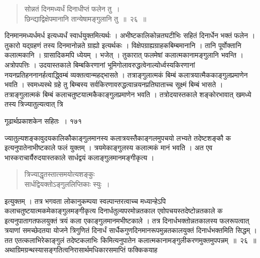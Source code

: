 \documentclass[11pt, openany]{book}
\begin{document}
\begin{quote}
  {\ssi सोन्नतं दिनमध्यर्धं दिनाधीप्तं फलेन तु~।\\
छिन्द्याद्विक्षेपमानानि तान्येषामङ्गुलानि तु~॥~२६~॥}
\end{quote}

\begin{sloppypar}
 दिनमानमध्यर्धमर्ध इत्यध्यर्धं स्वार्धयुक्तमित्यर्थः । अभीष्टकालिकोन्नतघटीभिः सहितं दिनार्धेन भक्तं फलेन । तुकारो यद्ग्रहणं तस्य दिनमानोन्नते ग्राह्यो इत्यर्थकः । विक्षेपग्राह्यग्राहकबिम्बमानानि । तानि पूर्वोक्तानि कलात्मकानि । ग्रासादिकमपि ध्येयम् । भजेत् । तुकारात् फलमेषां कलात्मकानामङ्गुलानि भवन्ति । अत्रोपपत्तिः । उदयास्तकाले बिम्बकिरणानां भूमिगोलावरुद्धत्वेनाल्योर्ध्वस्यकिरणानां नयनप्रतिहननानर्हत्वाद्ध्विम्बं व्यक्तत्वान्महद्भासते । तत्राङ्गुलात्मकं बिम्बं कलात्रयात्मैककाङ्गुलप्रमाणेन भवति । स्वमध्यस्थे ग्रहे तु बिम्बस्य सर्वकिरणावरुद्धत्वान्नयनप्रतिघाताच्च सूक्ष्मं बिम्बं भासते । तत्राङ्गुलात्मकं बिम्बं कलाचतुष्टयात्मकैकाङ्गुलप्रमाणेन भवति । तत्रोदयास्तकाले शङ्कोरभावात् खमध्ये तस्य त्रिज्यातुल्यत्वात् त्रि
\end{sloppypar}

\newpage

\hspace{3cm}  गूढार्थप्रकाशकेन सहितः~। \hfill १७१
\vspace{1cm}

\begin{sloppypar}
\noindent ज्यातुल्यशङ्कावुदयकालिकौकाङ्गुलमानस्य कलात्रयस्तैकाङ्गलमुपचयो लभ्यते तदेष्टशङ्कौ क इत्यनुपातेनाभीष्टकाले फलं युक्तम् । त्रयमेकाङ्गुलस्य कलात्मकं मानं भवति । अत एव भास्कराचार्यैरुदयास्तकाले सार्धद्वयं कलाङ्गुलमानमङ्गीकृत्य ।
\end{sloppypar}


\begin{quote}
 {\qt त्रिज्याद्धृतस्तात्समयोत्यशङ्कुः\\
सार्धद्वियक्तोऽङ्गुललिप्तिकाः स्युः~।}
\end{quote}

\begin{sloppypar}
इत्युक्तम् । तत्र भगवता लोकानुकम्पया स्वल्पान्तरत्वाच्च मध्यान्हेऽपि कलाचतुष्टयात्मकमेकाङ्गुलमङ्गीकृत्य दिनार्धतुल्यपरमोन्नतकाल एवोपचयस्तदेष्टोन्नतकाले क इत्यनुपातागतफलयुक्तं त्रयं कला एकाङ्गुलमानमभीष्टकाले । तत्र दिनार्धभक्तोन्नतकालस्य फलरूपत्वात् त्रयाणां समच्छेदतया योजने त्रिगुणितं दिनार्धं सार्धैकगुणदिनमानरूपमुन्नतकालयुक्तं दिनार्धभक्तमिति सिद्धम् । तत एतत्कलाभिरेकाङ्गुलं तदेष्टकलाभिः किमित्यनुपातेन कलात्मकानामङ्गुलीकरणमुक्तमुपपन्नम्~॥~२६~॥\\
\noindent अथाग्रिमग्रन्थस्यासङ्गतित्वनिरासार्थमधिकारसमाप्तिं फक्किकयाह\textendash
\end{sloppypar}
\end{document}
